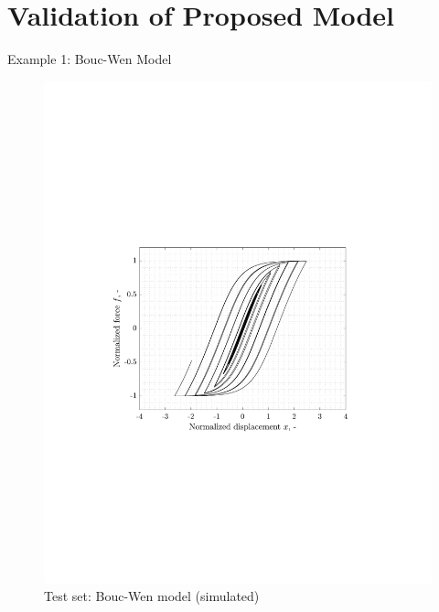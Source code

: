 \documentclass[9pt]{beamer}
\newcounter{frame}[frame]
\begin{document}
\section{Validation of Proposed Model}
\begin{frame}{Example 1: Bouc-Wen Model}
\begin{figure}
	\includegraphics[height=.8\textheight]{neuralNetHysteresis01}
	\caption{Test set: Bouc-Wen model (simulated)}
\end{figure}
\end{frame}
\end{document}
